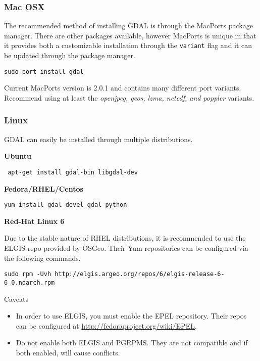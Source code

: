 \subsubsection*{Mac OSX}

The recommended method of installing GDAL is through the MacPorts package manager.
There are other packages available, however MacPorts is unique in that it provides both a customizable
installation through the \texttt{variant} flag and it can be updated through
the package manager.

\begin{verbatim}
sudo port install gdal
\end{verbatim}

Current MacPorts version is 2.0.1 and contains many different port variants.  Recommend
using at least the \emph{openjpeg, geos, lzma, netcdf, and poppler} variants.


\subsubsection*{Linux}

GDAL can easily be installed through multiple distributions.  

\noindent\textbf{Ubuntu}

\begin{verbatim}
 apt-get install gdal-bin libgdal-dev 
\end{verbatim}

\noindent\textbf{Fedora/RHEL/Centos}

\begin{verbatim}
yum install gdal-devel gdal-python
\end{verbatim}

\noindent\textbf{Red-Hat Linux 6}

Due to the stable nature of RHEL distributions, it is recommended to 
use the ELGIS repo provided by OSGeo.  Their Yum repositories can be
configured via the following commands. 

\begin{verbatim}
sudo rpm -Uvh http://elgis.argeo.org/repos/6/elgis-release-6-6_0.noarch.rpm
\end{verbatim}

Caveats
\begin{itemize}
\item[] In order to use ELGIS, you must enable the EPEL repository.  Their repos can be configured at \url{http://fedoraproject.org/wiki/EPEL}. 
\item[] Do not enable both ELGIS and PGRPMS.  They are not compatible and if both enabled, will cause conflicts.
\end{itemize}

